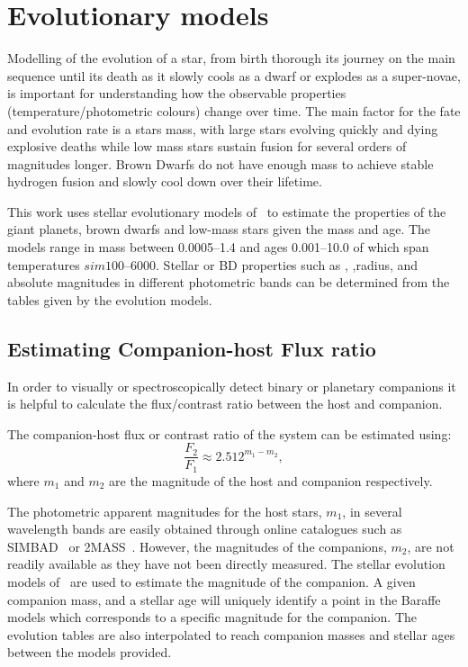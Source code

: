 
\section{Evolutionary models}
\label{sec:evolutionary_models}
Modelling of the evolution of a star, from birth thorough its journey on the main sequence until its death as it slowly cools as a dwarf or explodes as a super-novae, is important for understanding how the observable properties  (temperature/photometric colours) change over time.
The main factor for the fate and evolution rate is a stars mass, with large stars evolving quickly and dying explosive deaths while low mass stars sustain fusion for several orders of magnitudes longer.
Brown Dwarfs do not have enough mass to achieve stable hydrogen fusion and slowly cool down over their lifetime.

This work uses stellar evolutionary models of~\citet{baraffe_evolutionary_2003, baraffe_new_2015} to estimate the properties of the giant planets, brown dwarfs and low-mass stars given the mass and age.
The models range in mass between 0.0005--1.4\Msun{} and ages 0.001--10.0\Gyr{} of which span temperatures $sim100$--6000\K{}.
Stellar or {BD} properties such as \Teff{}, \logg{},radius, and absolute magnitudes in different photometric bands can be determined from the tables given by the evolution models.

\subsection{Estimating Companion-host Flux ratio}
\label{subsec:compaion_flux_ratio}
In order to visually or spectroscopically detect binary or planetary companions it is helpful to calculate the flux/contrast ratio between the host and companion.

The companion-host flux or contrast ratio of the system can be estimated using:
\begin{equation}
\frac{F_{2}}{F_{1}} \approx 2.512^{m_{1} - m_{2}}, \label{eqn:mag_flux_ratios}
\end{equation}
where \(m_{1}\) and \(m_{2}\) are the magnitude of the host and companion respectively.

The photometric apparent magnitudes for the host stars, \(m_{1}\), in several wavelength bands are easily obtained through online catalogues such as {SIMBAD}~\citep{wenger_simbad_2000} or {2MASS}~\citep{skrutskie_two_2006}.
However, the magnitudes of the companions, \(m_{2}\), are not readily available as they have not been directly measured.
The stellar evolution models of~\citet{baraffe_evolutionary_2003, baraffe_new_2015} are used to estimate the magnitude of the companion.
A given companion mass, and a stellar age will uniquely identify a point in the Baraffe models which corresponds to a specific magnitude for the companion.
The evolution tables are also interpolated to reach companion masses and stellar ages between the models provided.

